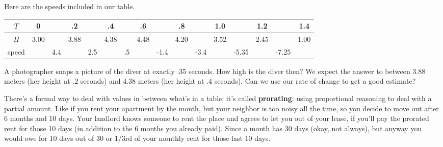 Here are the speeds included in our table.  
\begin{center}
\begin{tabular} {|c| | c|c|c|  c|c|c| c|c|c| c|c|c| c|c|c| } \hline
$T$ & 0 & &.2 & &.4 & &.6 & &.8 & &1.0 & &1.2 & &1.4 \\ \hline
$H$ & 3.00 && 3.88 && 4.38 && 4.48 && 4.20  && 3.52 && 2.45 && 1.00 \\ \hline
speed && 4.4 && 2.5 && .5 && -1.4 && -3.4 && -5.35 && -7.25 & \\ \hline
\end{tabular}
\end{center}

A photographer snaps a picture of the diver at exactly .35 seconds.  How high is the diver then?  We expect the answer to between 3.88 meters (her height at .2 seconds) and 4.38 meters (her height at .4 seconds).  Can we use our rate of change to get a good estimate?

There's a formal way to deal with values in between what's in a table; it's called \textbf{prorating}:  using proportional reasoning to deal with a partial amount.  Like if you rent your apartment by the month, but your neighbor is too noisy all the time, so you decide to move out after 6 months and 10 days.  Your landlord knows someone to rent the place and agrees to let you out of your lease, if you'll pay the prorated rent for those 10 days (in addition to the 6 months you already paid).  Since a month has 30 days (okay, not always), but anyway you would owe for 10 days out of 30 or 1/3rd of your monthly rent for those last 10 days.  


